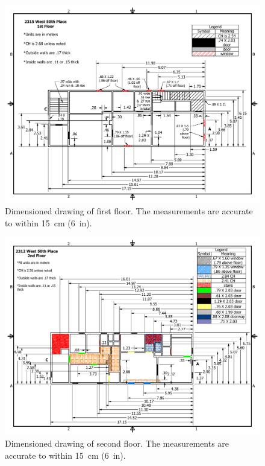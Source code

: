 \documentclass[12pt,oneside]{book}
\begin{document}
\begin{figure}[!ht]
\centering
\includegraphics[width=1\textwidth]{../Figures/50th_Place_1st_Floor}
\caption[Dimensioned drawing of first floor.]{Dimensioned drawing of first floor. The measurements are accurate to within 15~cm (6~in).}
\label{fig:first_floor}
\end{figure}

\begin{figure}[!ht]
\centering
\includegraphics[width=1\textwidth]{../Figures/50th_Place_2nd_Floor}
\caption[Dimensioned drawing of second floor.]{Dimensioned drawing of second floor. The measurements are accurate to within 15~cm (6~in).}
\label{fig:second_floor}
\end{figure}
\end{document}
